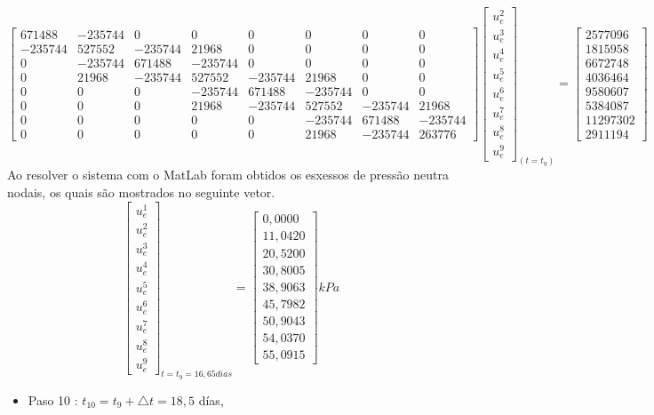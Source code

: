 \documentclass{article} %
\begin{document}
\begin{equation*}
\begin{bmatrix}
671488& -235744& 0& 0& 0& 0& 0& 0\\
-235744&527552&-235744&21968& 0& 0& 0& 0\\
0&-235744&671488&-235744& 0& 0& 0& 0\\
0&21968&-235744&527552&-235744&21968& 0& 0\\
0&0&0& -235744&671488&-235744& 0& 0\\
0&0&0&21968&-235744&527552&-235744&21968\\
0&0&0&0&0&-235744&671488&-235744\\
0&0&0&0&0&21968&-235744&263776
\end{bmatrix}\begin{bmatrix}
u_e^2\\
u_e^3\\
u_e^4\\
u_e^5\\
u_e^6\\
u_e^7\\
u_e^8\\
u_e^9
\end{bmatrix}_{(t=t_9)}
=\begin{bmatrix}
2577096\\
1815958\\
6672748\\
4036464\\
9580607\\
5384087\\
11297302\\
2911194
\end{bmatrix}
\end{equation*}
\indent Ao resolver o sistema com o MatLab foram obtidos os esxessos de pressão neutra nodais, os quais são mostrados no seguinte vetor.
\begin{equation}\label{t9}
\begin{bmatrix}
u_e^1\\
u_e^2\\
u_e^3\\
u_e^4\\
u_e^5\\
u_e^6\\
u_e^7\\
u_e^8\\
u_e^9
\end{bmatrix}_{t=t_9=16,65dias}=\begin{bmatrix}
0,0000\\
11,0420\\
20,5200\\
30,8005\\
38,9063\\
45,7982\\
50,9043\\
54,0370\\
55,0915
\end{bmatrix}kPa
\end{equation}
\begin{itemize}
	\item Paso 10 : \(t_10=t_9+\triangle t=18,5\) días,
\end{itemize}
\end{document}
